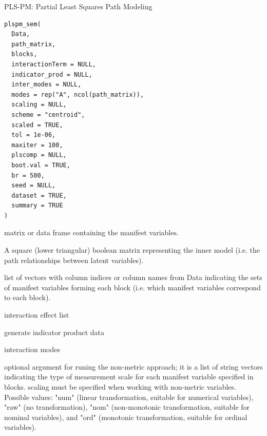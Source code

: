 \documentclass[a4paper]{book}
\begin{document}
%
\begin{Description}
PLS-PM: Partial Least Squares Path Modeling
\end{Description}
%
\begin{Usage}
\begin{verbatim}
plspm_sem(
  Data,
  path_matrix,
  blocks,
  interactionTerm = NULL,
  indicator_prod = NULL,
  inter_modes = NULL,
  modes = rep("A", ncol(path_matrix)),
  scaling = NULL,
  scheme = "centroid",
  scaled = TRUE,
  tol = 1e-06,
  maxiter = 100,
  plscomp = NULL,
  boot.val = TRUE,
  br = 500,
  seed = NULL,
  dataset = TRUE,
  summary = TRUE
)
\end{verbatim}
\end{Usage}
%
\begin{Arguments}
\begin{ldescription}
\item[\code{Data}] matrix or data frame containing the manifest variables.

\item[\code{path\_matrix}] A square (lower triangular) boolean matrix
representing the inner model (i.e. the path relationships between latent variables).

\item[\code{blocks}] list of vectors with column indices
or column names from Data indicating the sets of
manifest variables forming each block (i.e.
which manifest variables correspond to each block).

\item[\code{interactionTerm}] interaction effect list

\item[\code{indicator\_prod}] generate indicator product data

\item[\code{inter\_modes}] interaction modes

\item[\code{modes}] optional argument for runing the non-metric approach;
it is a list of string vectors indicating the type of measurement
scale for each manifest variable specified in blocks. scaling must be
specified when working with non-metric variables. Possible values:
"num" (linear transformation, suitable for numerical variables),
"raw" (no transformation), "nom" (non-monotonic transformation,
suitable for nominal variables), and "ord" (monotonic transformation,
suitable for ordinal variables).


\end{ldescription}
\end{Arguments}
\end{document}

